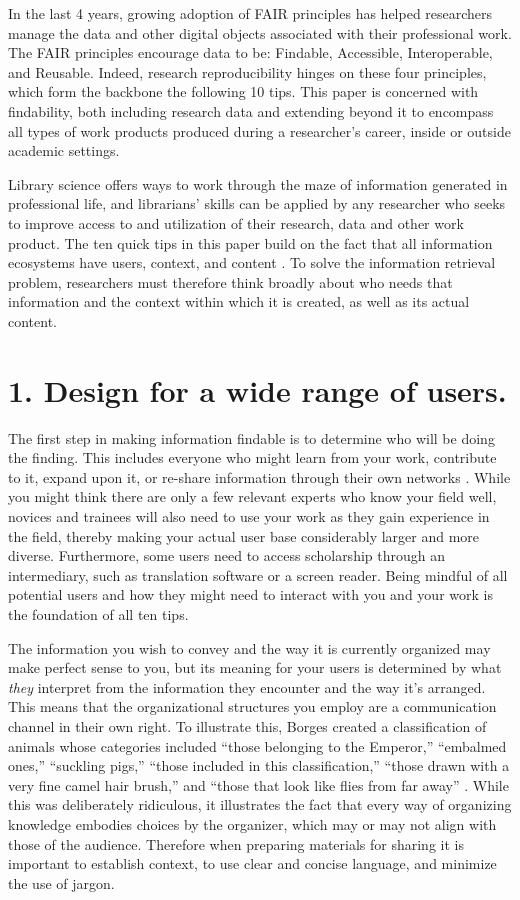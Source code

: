\documentclass[10pt,letterpaper]{article}
\newcommand{\rulemajor}[1]{\section*{#1}}
\begin{document}
In the last 4 years, growing adoption of FAIR principles \cite{Wilkinson2016} has helped
researchers manage the data and other digital objects associated with their professional
work. The FAIR principles encourage data to be: Findable, Accessible,
Interoperable, and Reusable. Indeed, research reproducibility hinges
on these four principles, which form the backbone the following 10 tips. 
This paper is concerned with findability, both including research data and extending beyond
it to encompass all types of work products produced during a researcher's career, 
inside or outside academic settings.

Library science offers ways to work through the maze of information generated in
professional life, and librarians' skills can be applied by any researcher who
seeks to improve access to and utilization of their research, data and other work product. The ten quick tips in this paper build on the fact that all
information ecosystems have users, context, and content \cite{Rosenfeld2015}.
To solve the information retrieval problem, researchers must therefore think
broadly about who needs that information and the context within which it is
created, as well as its actual content.

\rulemajor{1. Design for a wide range of users.}

The first step in making information findable is to determine who will be doing
the finding. This includes everyone who might learn from your work, contribute to it,
expand upon it, or re-share information through their own networks \cite{Covert2014}.
While you might think there are only a few relevant experts who know your field well, 
novices and trainees will also need to use your work as they gain experience in the field,
thereby making your actual user base considerably larger and more diverse. Furthermore,
some users need to access scholarship through an intermediary, such as translation
software or a screen reader. Being mindful of all potential users and how they
might need to interact with you and your work is the foundation of all ten tips.

The information you wish to convey and the way it is currently organized may
make perfect sense to you, but its meaning for your users is determined by what
\emph{they} interpret from the information they encounter and the way it's
arranged. This means that the organizational structures you employ are a
communication channel in their own right. To illustrate this, Borges created a
classification of animals whose categories included ``those belonging to the
Emperor,'' ``embalmed ones,'' ``suckling pigs,'' ``those included in this
classification,'' ``those drawn with a very fine camel hair brush,'' and ``those
that look like flies from far away'' \cite{Borges2000}. While this was
deliberately ridiculous, it illustrates the fact that every way of organizing
knowledge embodies choices by the organizer, which may or may not align with
those of the audience. Therefore when preparing materials for sharing it is important
to establish context, to use clear and concise language, and minimize the use of jargon.
\end{document}
